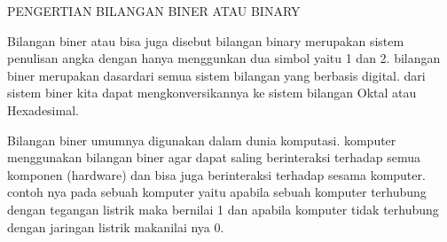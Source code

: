 PENGERTIAN BILANGAN BINER ATAU BINARY

Bilangan biner atau bisa juga disebut bilangan binary merupakan sistem penulisan angka dengan hanya menggunkan dua simbol yaitu 1 dan 2. bilangan biner merupakan dasardari semua sistem bilangan yang berbasis digital. dari sistem biner kita dapat mengkonversikannya ke sistem bilangan Oktal atau Hexadesimal.

Bilangan biner umumnya digunakan dalam dunia komputasi. komputer menggunakan bilangan biner agar dapat saling berinteraksi terhadap semua komponen (hardware) dan bisa juga berinteraksi terhadap sesama komputer. contoh nya pada sebuah komputer yaitu apabila sebuah komputer terhubung dengan tegangan listrik maka bernilai 1 dan apabila komputer tidak terhubung dengan jaringan listrik makanilai nya 0.